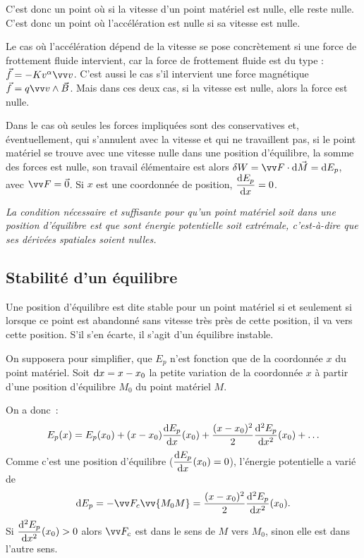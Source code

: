 C'est donc un point où si la vitesse d'un point matériel est nulle, elle reste 
nulle. C'est donc un point où l'accélération est nulle si sa vitesse est nulle.

Le cas où l'accélération dépend de la vitesse se pose concrètement si une force 
de frottement fluide intervient, car la force de frottement fluide est du type 
: \(\vec{f}=-Kv^{\alpha}\vvv\). C'est aussi le cas s'il intervient une force 
magnétique \(\vec{f} = q\vvv \wedge \vec{B}\). Mais dans ces deux cas, si la 
vitesse est nulle, alors la force est nulle.

Dans le cas où seules les forces impliquées sont des conservatives et, 
éventuellement, qui s'annulent avec la vitesse et qui ne travaillent pas, si le 
point matériel se trouve avec une vitesse nulle dans une position d'équilibre, 
la somme des forces est nulle, son travail élémentaire est alors \(\delta W=\vF 
\cdot \D\vec{M}=\D E_p\), avec \(\vF=\vec{0}\). Si \(x\) est une coordonnée de 
position, \(\dfrac{\mathrm{d} E_p}{\mathrm{d} x}=0\).

\emph{La condition nécessaire et suffisante pour qu'un point matériel soit dans 
une position d'équilibre est que sont énergie potentielle soit extrémale, 
c'est-à-dire que ses dérivées spatiales soient nulles.}%

\subsection{Stabilité d'un équilibre}%
\label{chap4-subsec:stabiliteequilibre}%

\begin{defdef}%
  Une position d'équilibre est dite stable pour un point matériel si et 
  seulement si lorsque ce point est abandonné sans vitesse très près de cette 
  position, il va vers cette position. S'il s'en écarte, il s'agit d'un 
  équilibre instable.
\end{defdef}%

On supposera pour simplifier, que \(E_p\) n'est fonction que de la coordonnée 
\(x\) du point matériel. Soit \(\mathrm{d} x = x-x_0\) la petite variation de la 
coordonnée \(x\) à partir d'une position d'équilibre \(M_0\) du point matériel 
\(M\).

On a donc~:
\begin{equation}%
  E_p(x) = E_p(x_0) +(x-x_0)\derived{E_p}{x}(x_0) 
  +\frac{(x-x_0)^2}{2}\deriveds{E_p}{x}(x_0) + \ldots
\end{equation}%
Comme c'est une position d'équilibre (\(\dfrac{\mathrm{d} E_p}{\mathrm{d} x}(x_0)=0\)), l'énergie 
potentielle a varié de
\begin{equation}%
  \D E_p = -\vF_c \vv{M_0M} = \frac{(x-x_0)^2}{2}\deriveds{E_p}{x}(x_0).
\end{equation}%
Si \(\dfrac{\mathrm{d}^2 E_p}{\mathrm{d} {x}^2}(x_0)>0\) alors \(\vF_c\) est dans le sens de \(M\) vers 
\(M_0\), sinon elle est dans l'autre sens.

